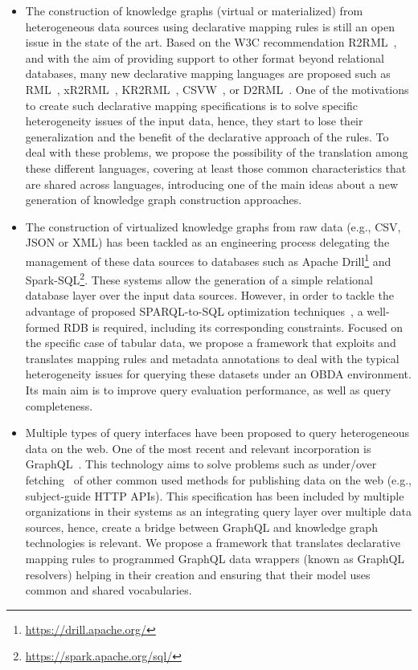 \begin{itemize}
    \item The construction of knowledge graphs (virtual or materialized) from heterogeneous data sources using declarative mapping rules is still an open issue in the state of the art. Based on the W3C recommendation R2RML~\citep{R2RML}, and with the aim of providing support to other format beyond relational databases, many new declarative mapping languages are proposed such as RML~\citep{dimou2014rml}, xR2RML~\citep{michel2015translation}, KR2RML~\citep{slepicka2015kr2rml}, CSVW~\citep{tennison2015model}, or D2RML~\citep{chortaras2018mapping}. 
    One of the motivations to create such declarative mapping specifications is to solve specific heterogeneity issues of the input data, hence, they start to lose their generalization and the benefit of the declarative approach of the rules. To deal with these problems, we propose the possibility of the translation among these different languages, covering at least those common characteristics that are shared across languages, introducing one of the main ideas about a new generation of knowledge graph construction approaches.
    \item The construction of virtualized knowledge graphs from raw data (e.g., CSV, JSON or XML) has been tackled as an engineering process delegating the management of these data sources to databases such as Apache Drill\footnote{\url{https://drill.apache.org/}} and Spark-SQL\footnote{\url{https://spark.apache.org/sql/}}. These systems allow the generation of a simple relational database layer over the input data sources. However, in order to tackle the advantage of proposed SPARQL-to-SQL optimization techniques~\citep{priyatna2014formalisation,calvanese2017ontop}, a well-formed RDB is required, including its corresponding constraints. Focused on the specific case of tabular data, we propose a framework that exploits and translates mapping rules and metadata annotations to deal with the typical heterogeneity issues for querying these datasets under an OBDA environment. Its main aim is to improve query evaluation performance, as well as query completeness.
    \item Multiple types of query interfaces have been proposed to query heterogeneous data on the web. One of the most recent and relevant incorporation is GraphQL~\citep{graphql}. This technology aims to solve problems such as under/over fetching~\citep{bryant2017graphql,vogel2017experiences,mukhiya2019graphql} of other common used methods for publishing data on the web (e.g., subject-guide HTTP APIs). This specification has been included by multiple organizations in their systems as an integrating query layer over multiple data sources, hence, create a bridge between GraphQL and knowledge graph technologies is relevant. We propose a framework that translates declarative mapping rules to programmed GraphQL data wrappers (known as GraphQL resolvers) helping in their creation and ensuring that their model uses common and shared vocabularies.
\end{itemize}

